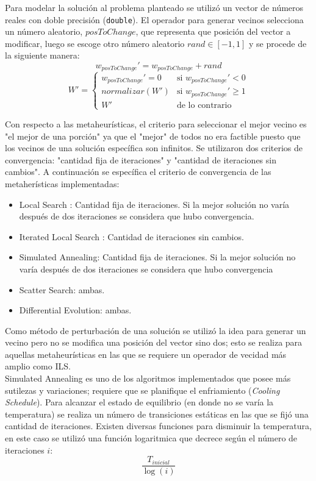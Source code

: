 \documentclass{ci5652}
\begin{document}
Para modelar la solución al problema planteado se utilizó un vector de números
reales con doble precisión (\texttt{double}). El operador para generar vecinos
selecciona un número aleatorio, $posToChange$, que representa que posición del
vector  a modificar, luego se escoge otro número aleatorio $rand \in [-1, 1]$
y se procede de la siguiente manera:
$$w_{posToChange}' =  w_{posToChange} + rand$$
\[
  W' =
  \begin{cases}
    w_{posToChange}' = 0 & \text{si } w_{posToChange}' < 0\\
    normalizar(W')       & \text{si } w_{posToChange}' \geq 1\\
    W'                   & \text{de lo contrario}
  \end{cases}
\]

Con respecto a las metaheurísticas, el criterio para seleccionar el mejor vecino
es "el mejor de una porción" ya que el "mejor" de todos no era factible puesto
que los vecinos de una solución específica son infinitos. Se utilizaron dos
criterios de convergencia: "cantidad fija de iteraciones" y "cantidad de
iteraciones sin cambios". A continuación se específica el criterio de
convergencia de las metaherísticas implementadas:

\begin{itemize}
  \item Local Search : Cantidad fija de iteraciones. Si la mejor solución no
  varía después de dos iteraciones se considera que hubo convergencia.
  \item Iterated Local Search : Cantidad de iteraciones sin cambios.
  \item Simulated Annealing: Cantidad fija de iteraciones. Si la mejor solución
  no varía después de dos iteraciones se considera que hubo convergencia
  \item Scatter Search: ambas.
  \item Differential Evolution: ambas.
\end{itemize}

Como método de perturbación de una solución se utilizó la idea para generar un
vecino pero no se modifica una posición del vector sino dos; esto se realiza
para aquellas metaheurísticas en las que se requiere un operador de vecidad
más amplio como ILS.\\

Simulated Annealing es uno de los algoritmos implementados que posee más sutilezas y variaciones; requiere que se planifique el enfriamiento (\textit{Cooling Schedule}). Para alcanzar el estado de equilibrio (en donde no se varía la temperatura) se realiza un número de transiciones estáticas en las que se fijó una cantidad de iteraciones. Existen diversas funciones para disminuir la temperatura, en este caso se utilizó una función logaritmica que decrece según el número de iteraciones $i$: $$\frac{T_{inicial}}{\log(i)}$$
\end{document}
